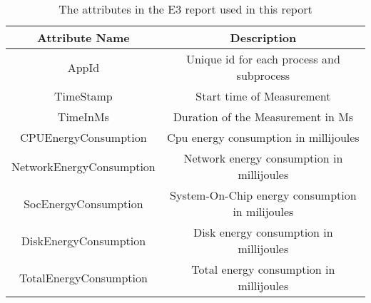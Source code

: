 \begin{table}[ht]
    \centering
    \begin{tabular}{||c|c||}
    \hline
    \textbf{Attribute Name}  & \textbf{Description}                            \\ [0.5ex] \hline\hline
    AppId                    & Unique id for each process and subprocess       \\ 
    TimeStamp                & Start time of Measurement                       \\ 
    TimeInMs                 & Duration of the Measurement in Ms               \\ 
    CPUEnergyConsumption     & Cpu energy consumption in millijoules           \\ 
    NetworkEnergyConsumption & Network energy consumption in millijoules       \\ 
    SocEnergyConsumption     & System-On-Chip energy consumption in milijoules \\ 
    DiskEnergyConsumption    & Disk energy consumption in millijoules          \\ 
    TotalEnergyConsumption   & Total energy consumption in millijoules         \\ \hline
    \end{tabular}
    \caption{The attributes in the E3 report used in this report}
    \label{tab:E3_attr_Table}
    \end{table}